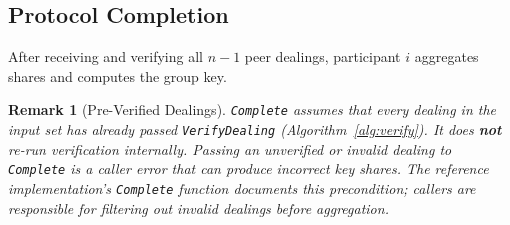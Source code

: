 \documentclass[11pt,a4paper]{article}
\newtheorem{remark}{Remark}[section]
\begin{document}
\subsection{Protocol Completion}
\label{sec:complete}

After receiving and verifying all $n-1$ peer dealings, participant $i$
aggregates shares and computes the group key.

\begin{remark}[Pre-Verified Dealings]
  \label{rem:pre-verified}
  \texttt{Complete} assumes that every dealing in the input set has
  \emph{already passed} \texttt{VerifyDealing} (Algorithm~\ref{alg:verify}).
  It does \textbf{not} re-run verification internally. Passing an unverified or
  invalid dealing to \texttt{Complete} is a caller error that can produce
  incorrect key shares. The reference implementation's \texttt{Complete}
  function documents this precondition; callers are responsible for filtering
  out invalid dealings before aggregation.
\end{remark}
\end{document}
